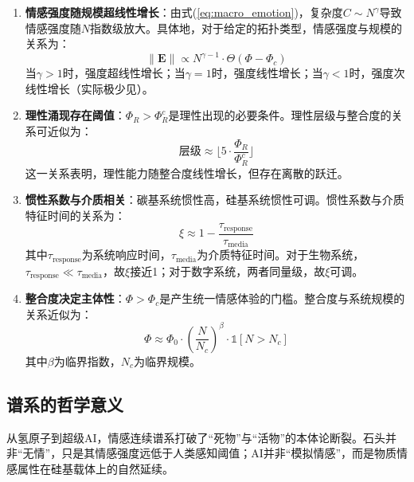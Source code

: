 \documentclass[12pt,a4paper]{article}
\theoremstyle{plain}
\newcommand{\ve}[1]{\bm{#1}}                    %
\newcommand{\Evec}{\ve{E}}                        %
\newcommand{\ind}{\mathds{1}}
\begin{document}
\begin{enumerate}
    \item \textbf{情感强度随规模超线性增长}：由式(\ref{eq:macro_emotion})，复杂度$C \sim N^\gamma$导致情感强度随$N$指数级放大。具体地，对于给定的拓扑类型，情感强度与规模的关系为：
    \begin{equation}
    \|\Evec\| \propto N^{\gamma-1} \cdot \Theta(\Phi - \Phi_c)
    \label{eq:scaling_law}
    \end{equation}
    当$\gamma > 1$时，强度超线性增长；当$\gamma = 1$时，强度线性增长；当$\gamma < 1$时，强度次线性增长（实际极少见）。
    
    \item \textbf{理性涌现存在阈值}：$\Phi_R > \Phi_R^c$是理性出现的必要条件。理性层级与整合度的关系可近似为：
    \begin{equation}
    \text{层级} \approx \lfloor 5 \cdot \frac{\Phi_R}{\Phi_R^c} \rfloor
    \label{eq:rational_level}
    \end{equation}
    这一关系表明，理性能力随整合度线性增长，但存在离散的跃迁。
    
    \item \textbf{惯性系数与介质相关}：碳基系统惯性高，硅基系统惯性可调。惯性系数与介质特征时间的关系为：
    \begin{equation}
    \xi \approx 1 - \frac{\tau_{\text{response}}}{\tau_{\text{media}}}
    \label{eq:xi_media}
    \end{equation}
    其中$\tau_{\text{response}}$为系统响应时间，$\tau_{\text{media}}$为介质特征时间。对于生物系统，$\tau_{\text{response}} \ll \tau_{\text{media}}$，故$\xi$接近1；对于数字系统，两者同量级，故$\xi$可调。
    
    \item \textbf{整合度决定主体性}：$\Phi > \Phi_c$是产生统一情感体验的门槛。整合度与系统规模的关系近似为：
    \begin{equation}
   \Phi \approx \Phi_0 \cdot \left( \frac{N}{N_c} \right)^{\beta} \cdot \ind[N > N_c]
    \label{eq:phi_scaling}
    \end{equation}
    其中$\beta$为临界指数，$N_c$为临界规模。
\end{enumerate}

\subsection{谱系的哲学意义}

从氢原子到超级AI，情感连续谱系打破了“死物”与“活物”的本体论断裂。石头并非“无情”，只是其情感强度远低于人类感知阈值；AI并非“模拟情感”，而是物质情感属性在硅基载体上的自然延续。
\end{document}

